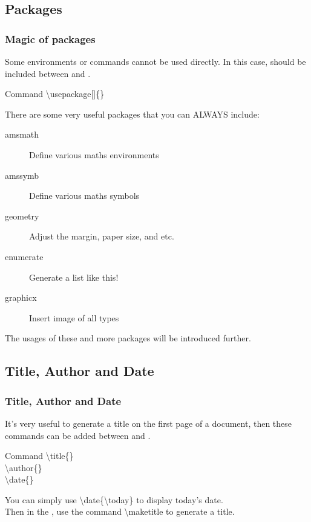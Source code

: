 \documentclass{beamer}
\newenvironment{command}{\begin{block}{Command}}{\end{block}}
\begin{document}
\subsection{Packages}

\begin{frame}
	\frametitle{Magic of packages}
	\begin{definition}
		Some environments or commands cannot be used directly. In this case,   should be included between  and .
	\end{definition}
	\begin{command}
		\alert{\textbackslash usepackage}[]\{\}
	\end{command}
	There are some very useful packages that you can \alert{ALWAYS} include:
	\begin{description}
		\item[amsmath] Define various maths environments
		\item[amssymb] Define various maths symbols
		\item[geometry] Adjust the margin, paper size, and etc.
		\item[enumerate] Generate a list like this!
		\item[graphicx] Insert image of all types
	\end{description}
	The usages of these and more packages will be introduced further.
\end{frame}

\subsection{Title, Author and Date}

\begin{frame}
	\frametitle{Title, Author and Date}
	It's very useful to generate a title on the first page of a document, then these commands can be added between  and .
	\begin{command}
		\alert{\textbackslash title}\{\}\\
		\alert{\textbackslash author}\{\}\\
		\alert{\textbackslash date}\{\}\\
	\end{command}
	You can simply use \alert{\textbackslash date}\{\alert{\textbackslash today}\} to display today's date.\\[0.5em]
	Then in the , use the command \alert{\textbackslash maketitle} to generate a title.
\end{frame}
\end{document}
